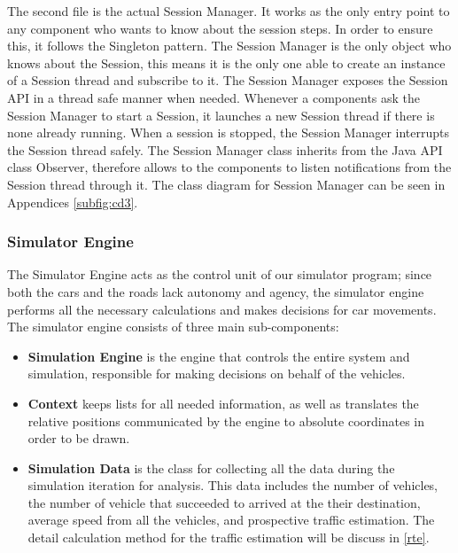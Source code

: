 \documentclass[11pt]{article}
\begin{document}
The second file is the actual Session Manager. It works as the only entry point to any component who wants to know about the session steps. In order to ensure this, it follows the Singleton pattern. The Session Manager is the only object who knows about the Session, this means it is the only one able to create an instance of a Session thread and subscribe to it. The Session Manager exposes the Session API in a thread safe manner when needed. Whenever a components ask the Session Manager to start a Session, it launches a new Session thread if there is none already running. When a session is stopped, the Session Manager interrupts the Session thread safely. The Session Manager class inherits from the Java API class Observer, therefore allows to the components to listen notifications from the Session thread through it. The class diagram for Session Manager can be seen in Appendices \ref{subfig:cd3}.

\subsubsection{Simulator Engine}

The Simulator Engine acts as the control unit of our simulator program; since both the cars and the roads lack autonomy and agency, the simulator engine performs all the necessary calculations and makes decisions for car movements. The simulator engine consists of three main sub-components:
\begin{itemize}

\item \textbf{Simulation Engine} is the engine that controls the entire system and simulation, responsible for making decisions on behalf of the vehicles.
\item \textbf{Context} keeps lists for all needed information, as well as translates the relative positions communicated by the engine to absolute coordinates in order to be drawn.
\item \textbf{Simulation  Data} is the class for collecting all the data during the simulation iteration for analysis. This data includes the number of vehicles, the number of vehicle that succeeded to arrived at the their destination, average speed from all the vehicles, and prospective traffic estimation. The detail calculation method for the traffic estimation will be discuss in \ref{rte}.

\end{itemize}
\end{document}
